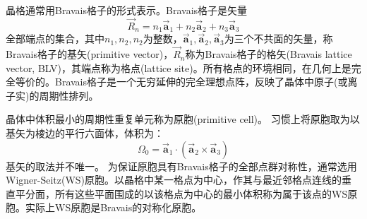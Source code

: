 晶格通常用Bravais格子的形式表示。Bravais格子是矢量
\begin{equation}
  \vec R_n=n_1\vec{\mathbf a}_1+n_2\vec{\mathbf a}_2+n_3\vec{\mathbf a}_3
  \label{eq:def-Bravais}
\end{equation}
全部端点的集合，其中$n_1,n_2,n_2$为整数，$\vec{\mathbf a}_1,\vec{\mathbf a}_2,\vec{\mathbf a}_3$为三个不共面的矢量，称Bravais格子的基矢(primitive vector)，$\vec R_n$称为Bravais格子的格矢(Bravais lattice vector, BLV)，其端点称为格点(lattice site)。所有格点的环境相同，在几何上是完全等价的。Bravais格子是一个无穷延伸的完全理想点阵，反映了晶体中原子(或离子实)的周期性排列。%


晶体中体积最小的周期性重复单元称为原胞(primitive cell)。%
习惯上将原胞取为以基矢为棱边的平行六面体，体积为：
\begin{equation}
  \Omega_0=\vec{\mathbf a}_1\cdot(\vec{\mathbf a}_2\times\vec{\mathbf a}_3)
  \label{eq:vol_pri_lattice}
\end{equation}
基矢的取法并不唯一。%
为保证原胞具有Bravais格子的全部点群对称性，通常选用Wigner-Seitz(WS)原胞。以晶格中某一格点为中心，作其与最近邻格点连线的垂直平分面，所有这些平面围成的以该格点为中心的最小体积称为属于该点的WS原胞。实际上WS原胞是Bravais的对称化原胞。


